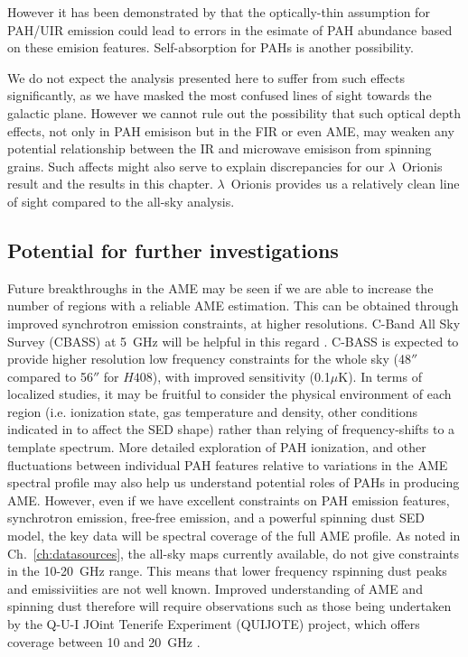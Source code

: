               However it has been demonstrated by \cite{sakon04} that the optically-thin assumption for PAH/UIR emission could lead to errors in the esimate of PAH abundance based on these emision features. Self-absorption for PAHs is another possibility.

              We do not expect the analysis presented here to suffer from such effects significantly, as we have masked the most confused lines of sight towards the galactic plane. However we cannot rule out the possibility that such optical depth effects, not only in PAH emisison but in the FIR or even AME, may weaken any potential relationship between the IR and microwave emisison from spinning grains. Such affects might also serve to explain discrepancies for our $\lambda$~Orionis result and the results in this chapter. $\lambda$~Orionis provides us a relatively clean line of sight compared to the all-sky analysis.

            \subsection{Potential for further investigations}
                Future breakthroughs in the AME may be seen if we are able to increase the number of regions with a reliable AME estimation. This can be obtained through improved synchrotron emission constraints, at higher resolutions. C-Band All Sky Survey (CBASS) at 5~GHz will be helpful in this regard \citep{irfan15}. C-BASS is expected to provide higher resolution low frequency constraints for the whole sky (48$''$ compared to 56$''$ for $H408$), with improved sensitivity (0.1$\mu$K). In terms of localized studies, it may be fruitful to consider the physical environment of each region (i.e. ionization state, gas temperature and density, other conditions indicated in \cite{draine98a, ali-haimoud10} to affect the SED shape) rather than relying of frequency-shifts to a template spectrum. More detailed exploration of PAH ionization, and other fluctuations between individual PAH features relative to variations in the AME spectral profile may also help us understand potential roles of PAHs in producing AME. However, even if we have excellent constraints on PAH emission features, synchrotron emission, free-free emission, and a powerful spinning dust SED model, the key data will be spectral coverage of the full AME profile. As noted in Ch.~\ref{ch:datasources}, the all-sky maps currently available, do not give constraints in the 10-20~GHz range. This means that lower frequency rspinning dust peaks and emissiviities are not well known. Improved understanding of AME and spinning dust therefore will require observations such as those being undertaken by the Q-U-I JOint Tenerife Experiment (QUIJOTE) project, which offers coverage between 10 and 20~GHz \citep{santos15}.

